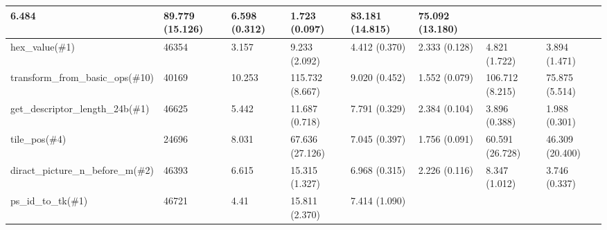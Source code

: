 \begin{table*}[]
\begin{tabular}{@{}llllllll@{}}
										\multicolumn{1}{l}{6.484} &
										\multicolumn{1}{l}{89.779 (15.126)} &
										\multicolumn{1}{l}{6.598 (0.312)} &
										\multicolumn{1}{l}{1.723 (0.097)} &
										\multicolumn{1}{l}{83.181 (14.815)} &
										\multicolumn{1}{l}{75.092 (13.180)} \\ \midrule
										\multicolumn{1}{l}{hex\_value(\#1)} &
										\multicolumn{1}{l}{46354} &
										\multicolumn{1}{l}{3.157} &
										\multicolumn{1}{l}{9.233 (2.092)} &
										\multicolumn{1}{l}{4.412 (0.370)} &
										\multicolumn{1}{l}{2.333 (0.128)} &
										\multicolumn{1}{l}{4.821 (1.722)} &
										\multicolumn{1}{l}{3.894 (1.471)} \\ \midrule
										\multicolumn{1}{l}{transform\_from\_basic\_ops(\#10)}
										& \multicolumn{1}{l}{40169} &
										\multicolumn{1}{l}{10.253} &
										\multicolumn{1}{l}{115.732 (8.667)} &
										\multicolumn{1}{l}{9.020 (0.452)} &
										\multicolumn{1}{l}{1.552 (0.079)} &
										\multicolumn{1}{l}{106.712 (8.215)} &
										\multicolumn{1}{l}{75.875 (5.514)} \\ \midrule
										\multicolumn{1}{l}{get\_descriptor\_length\_24b(\#1)}
										& \multicolumn{1}{l}{46625} &
										\multicolumn{1}{l}{5.442} &
										\multicolumn{1}{l}{11.687 (0.718)} &
										\multicolumn{1}{l}{7.791 (0.329)} &
										\multicolumn{1}{l}{2.384 (0.104)} &
										\multicolumn{1}{l}{3.896 (0.388)} &
										\multicolumn{1}{l}{1.988 (0.301)} \\ \midrule
										\multicolumn{1}{l}{tile\_pos(\#4)} &
										\multicolumn{1}{l}{24696} &
										\multicolumn{1}{l}{8.031} &
										\multicolumn{1}{l}{67.636 (27.126)} &
										\multicolumn{1}{l}{7.045 (0.397)} &
										\multicolumn{1}{l}{1.756 (0.091)} &
										\multicolumn{1}{l}{60.591 (26.728)} &
										\multicolumn{1}{l}{46.309 (20.400)} \\ \midrule
										\multicolumn{1}{l}{diract\_picture\_n\_before\_m(\#2)}
										& \multicolumn{1}{l}{46393} &
										\multicolumn{1}{l}{6.615} &
										\multicolumn{1}{l}{15.315 (1.327)} &
										\multicolumn{1}{l}{6.968 (0.315)} &
										\multicolumn{1}{l}{2.226 (0.116)} &
										\multicolumn{1}{l}{8.347 (1.012)} &
										\multicolumn{1}{l}{3.746 (0.337)} \\ \midrule
										\multicolumn{1}{l}{ps\_id\_to\_tk(\#1)} &
										\multicolumn{1}{l}{46721} &
										\multicolumn{1}{l}{4.41} &
										\multicolumn{1}{l}{15.811 (2.370)} &
										\multicolumn{1}{l}{7.414 (1.090)} &

\end{tabular}
\end{table*}
